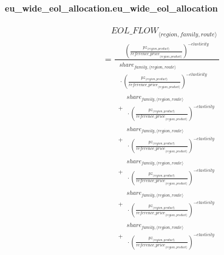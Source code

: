 \documentclass[11pt]{article}
\begin{document}
\paragraph{eu\_wide\_eol\_allocation.eu\_wide\_eol\_allocation}
\begin{align*}
&\quad {EOL\_FLOW}_{\langle region, family, route\rangle}\\
&= \frac{{\left(\frac{pz_{\langle region, product\rangle}}{{reference\_price}_{\langle region, product\rangle}}\right)}^{-elasticity}}{\begin{aligned}
\begin{aligned}
share_{family,\langle region, route\rangle}\\
{}\cdot {\left(\frac{pz_{\langle region, product\rangle}}{{reference\_price}_{\langle region, product\rangle}}\right)}^{-elasticity}
\end{aligned}\\
{}+ \begin{aligned}
share_{family,\langle region, route\rangle}\\
{}\cdot {\left(\frac{pz_{\langle region, product\rangle}}{{reference\_price}_{\langle region, product\rangle}}\right)}^{-elasticity}
\end{aligned}\\
{}+ \begin{aligned}
share_{family,\langle region, route\rangle}\\
{}\cdot {\left(\frac{pz_{\langle region, product\rangle}}{{reference\_price}_{\langle region, product\rangle}}\right)}^{-elasticity}
\end{aligned}\\
{}+ \begin{aligned}
share_{family,\langle region, route\rangle}\\
{}\cdot {\left(\frac{pz_{\langle region, product\rangle}}{{reference\_price}_{\langle region, product\rangle}}\right)}^{-elasticity}
\end{aligned}\\
{}+ \begin{aligned}
share_{family,\langle region, route\rangle}\\
{}\cdot {\left(\frac{pz_{\langle region, product\rangle}}{{reference\_price}_{\langle region, product\rangle}}\right)}^{-elasticity}
\end{aligned}\\
{}+ \begin{aligned}
share_{family,\langle region, route\rangle}\\
{}\cdot {\left(\frac{pz_{\langle region, product\rangle}}{{reference\_price}_{\langle region, product\rangle}}\right)}^{-elasticity}

\end{aligned}
\end{aligned}}
\end{align*}
\end{document}
